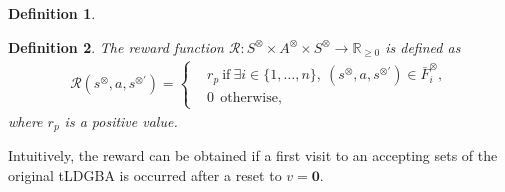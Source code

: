 \documentclass[letterpaper, 10 pt, conference]{ieeeconf}  %
\newtheorem{definition}{Definition}
\begin{document}
\begin{definition}

\label{def9}
\end{definition}

\begin{definition}
  The reward function $\mathcal{R} :S^{\otimes} \times A^{\otimes} \times S^{\otimes} \rightarrow {\mathbb R}_{\geq 0}$ is defined as
  \begin{align}
    \mathcal{R}(s^{\otimes}, a, s^{\otimes \prime}) =
    \left\{
    \begin{aligned}
      &r_p \  \text{if}\ \exists i \in \! \{ 1, \ldots ,n \},\ (s^{\otimes}, a, s^{\otimes \prime}) \in \bar{F}^{\otimes}_i \!,\\
      &0   \ \ \text{otherwise},
    \end{aligned}
    \right. \nonumber
  \end{align}
  where $r_p$ is a positive value.
  \label{def10}
\end{definition}

Intuitively, the reward can be obtained if a first visit to an accepting sets of the original tLDGBA is occurred after a reset to $v=\bm{0}$.
\end{document}
